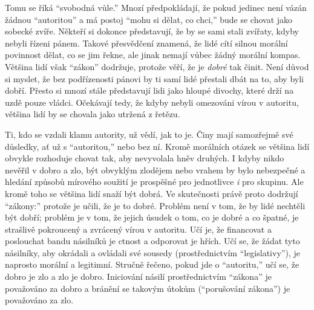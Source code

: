 \documentclass{book}
\begin{document}
Tomu se říká \enquote{svobodná vůle.} Mnozí předpokládají, že pokud jedinec není vázán žádnou \enquote{autoritou} a má postoj \enquote{mohu si dělat, co chci,} bude se chovat jako sobecké zvíře. Někteří si dokonce představují, že by se sami stali zvířaty, kdyby nebyli řízeni pánem. Takové přesvědčení znamená, že lidé cítí silnou morální povinnost dělat, co se jim řekne, ale jinak nemají vůbec žádný morální kompas. Většina lidí však \enquote{zákon} dodržuje, protože věří, že je \emph{dobré} tak činit. Není důvod si myslet, že bez podřízenosti pánovi by ti samí lidé přestali dbát na to, aby byli dobří. Přesto si mnozí stále představují lidi jako hloupé divochy, které drží na uzdě pouze vládci. Očekávají tedy, že kdyby nebyli omezováni vírou v autoritu, většina lidí by se chovala jako utržená z řetězu.

Ti, kdo se vzdali klamu autority, už vědí, jak to je. Činy mají samozřejmě své důsledky, ať už s \enquote{autoritou,} nebo bez ní. Kromě morálních otázek se většina lidí obvykle rozhoduje chovat tak, aby nevyvolala hněv druhých. I kdyby nikdo nevěřil v dobro a zlo, být obvyklým zlodějem nebo vrahem by bylo nebezpečné a hledání způsobů mírového soužití je prospěšné pro jednotlivce \emph{i} pro skupinu. Ale kromě toho se většina lidí snaží být dobrá. Ve skutečnosti právě proto dodržují \enquote{zákony:} protože je učili, že je to dobré. Problém není v tom, že by lidé nechtěli být dobří; problém je v tom, že jejich úsudek o tom, co je dobré a co špatné, je strašlivě pokroucený a zvrácený vírou v autoritu. Učí je, že financovat a poslouchat bandu násilníků je ctnost a odporovat je hřích. Učí se, že žádat tyto násilníky, aby okrádali a ovládali své sousedy (prostřednictvím \enquote{legislativy}), je naprosto morální a legitimní. Stručně řečeno, pokud jde o \enquote{autoritu,} učí se, že dobro je zlo a zlo je dobro. Iniciování násilí prostřednictvím \enquote{zákona} je považováno za dobro a bránění se takovým útokům (\enquote{porušování zákona}) je považováno za zlo.
\end{document}
